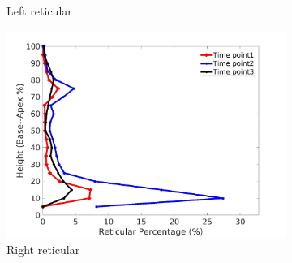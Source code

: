 \begin{figure}[H]
\begin{subfigure}{.42\linewidth}
  \caption{Left reticular}
  \label{fig:IPF6DiseaseAgainstHeight-c} 
\end{subfigure} 
\begin{subfigure}{.42\linewidth}%
  \includegraphics[width=\linewidth,trim={{.0\wd0} {.0\wd0} {.0\wd0} {.0\wd0}},clip]{Appendix/Image_AppexA/BaseToApex/IPF6RightLungReticularDiseaseAgainstHeight.jpg}
  \caption{Right reticular}
  \label{fig:IPF6DiseaseAgainstHeight-d}
\end{subfigure}
\begin{subfigure}{.42\linewidth}%

\end{subfigure}
\end{figure}
